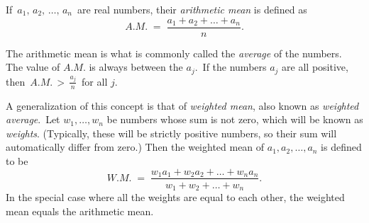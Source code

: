 \documentclass[12pt]{article}
\begin{document}
If\, $a_1,\,a_2,\,\ldots,\,a_n$\, are real numbers, their \emph{arithmetic mean} is defined as
$$A.M. \;=\; \frac{a_1+a_2+\ldots+a_n}{n}.$$

The arithmetic mean is what is commonly called the \emph{average} of the numbers.\, The value of $A.M.$ is always between the  $a_j$.\, If the numbers $a_j$ are all positive, then\, $A.M. \,>\, \frac{a_j}{n}$\, for all $j$.

A generalization of this  concept is that of \emph{weighted mean}, also known as
\emph {weighted average}.\, Let $w_1, \ldots, w_n$ be  numbers whose sum is not zero,
which will be known as \emph{weights}.  (Typically, these will be strictly 
positive numbers, so their sum will automatically differ from zero.)  Then the
weighted mean of $a_1,a_2,\ldots,a_n$ is defined to be
$$W.M. \;=\; 
\frac{w_1 a_1 + w_2 a_2 + \ldots + w_n a_n}{w_1\!+\!w_2\!+\!\ldots+\!w_n}.$$
In the special case where all the weights are equal to each other, the weighted mean equals the arithmetic mean.
\end{document}
